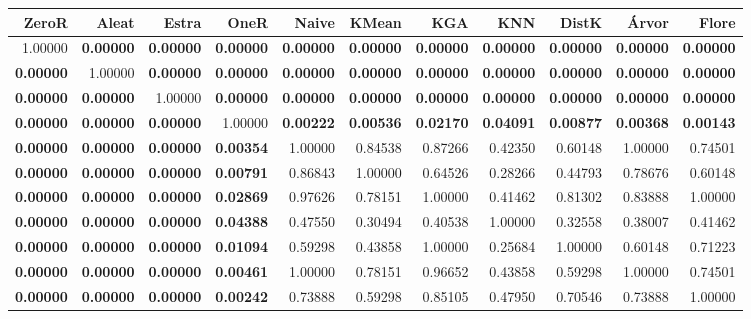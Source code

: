 \begin{table}
\centering
\label{Iristeste_pareado_table}
\begin{tabular}{rrrrrrrrrrr}
\toprule
           ZeroR &            Aleat &            Estra &            OneR  &            Naive &            KMean &              KGA &              KNN &            DistK &            Árvor &            Flore \\
\midrule
         1.00000 & \textbf{0.00000} & \textbf{0.00000} & \textbf{0.00000} & \textbf{0.00000} & \textbf{0.00000} & \textbf{0.00000} & \textbf{0.00000} & \textbf{0.00000} & \textbf{0.00000} & \textbf{0.00000} \\
\textbf{0.00000} &          1.00000 & \textbf{0.00000} & \textbf{0.00000} & \textbf{0.00000} & \textbf{0.00000} & \textbf{0.00000} & \textbf{0.00000} & \textbf{0.00000} & \textbf{0.00000} & \textbf{0.00000} \\
\textbf{0.00000} & \textbf{0.00000} &          1.00000 & \textbf{0.00000} & \textbf{0.00000} & \textbf{0.00000} & \textbf{0.00000} & \textbf{0.00000} & \textbf{0.00000} & \textbf{0.00000} & \textbf{0.00000} \\
\textbf{0.00000} & \textbf{0.00000} & \textbf{0.00000} &          1.00000 & \textbf{0.00222} & \textbf{0.00536} & \textbf{0.02170} & \textbf{0.04091} & \textbf{0.00877} & \textbf{0.00368} & \textbf{0.00143} \\
\textbf{0.00000} & \textbf{0.00000} & \textbf{0.00000} & \textbf{0.00354} &          1.00000 &          0.84538 &          0.87266 &          0.42350 &          0.60148 &          1.00000 &          0.74501 \\
\textbf{0.00000} & \textbf{0.00000} & \textbf{0.00000} & \textbf{0.00791} &          0.86843 &          1.00000 &          0.64526 &          0.28266 &          0.44793 &          0.78676 &          0.60148 \\
\textbf{0.00000} & \textbf{0.00000} & \textbf{0.00000} & \textbf{0.02869} &          0.97626 &          0.78151 &          1.00000 &          0.41462 &          0.81302 &          0.83888 &          1.00000 \\
\textbf{0.00000} & \textbf{0.00000} & \textbf{0.00000} & \textbf{0.04388} &          0.47550 &          0.30494 &          0.40538 &          1.00000 &          0.32558 &          0.38007 &          0.41462 \\
\textbf{0.00000} & \textbf{0.00000} & \textbf{0.00000} & \textbf{0.01094} &          0.59298 &          0.43858 &          1.00000 &          0.25684 &          1.00000 &          0.60148 &          0.71223 \\
\textbf{0.00000} & \textbf{0.00000} & \textbf{0.00000} & \textbf{0.00461} &          1.00000 &          0.78151 &          0.96652 &          0.43858 &          0.59298 &          1.00000 &          0.74501 \\
\textbf{0.00000} & \textbf{0.00000} & \textbf{0.00000} & \textbf{0.00242} &          0.73888 &          0.59298 &          0.85105 &          0.47950 &          0.70546 &          0.73888 &          1.00000 \\
\bottomrule
\end{tabular}
\end{table}
